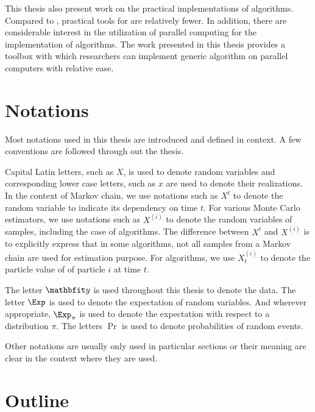 This thesis also present work on the practical implementations of \smc
algorithms. Compared to \mcmc, practical tools for \smc are relatively fewer.
In addition, there are considerable interest in the utilization of parallel
computing for the implementation of \smc algorithms. The work presented in
this thesis provides a toolbox with which researchers can implement generic
\smc algorithm on parallel computers with relative ease.

\section{Notations}
\label{sec:Notations}

Most notations used in this thesis are introduced and defined in context. A
few conventions are followed through out the thesis.

Capital Latin letters, such as $X$, is used to denote random variables and
corresponding lower case letters, such as $x$ are used to denote their
realizations. In the context of Markov chain, we use notations such as $X^t$
to denote the random variable to indicate its dependency on time $t$. For
various Monte Carlo estimators, we use notations such as $X^{(i)}$ to denote
the random variables of samples, including the case of  \mcmc algorithms. The
difference between $X^t$ and $X^{(i)}$ is to explicitly express that in some
algorithms, not all samples from a Markov chain are used for estimation
purpose. For \smc algorithms, we use $X_t^{(i)}$ to denote the particle value
of of particle $i$ at time $t$.

The letter $\data$ is used throughout this thesis to denote the data. The
letter $\Exp$ is used to denote the expectation of random variables. And
wherever appropriate, $\Exp_{\pi}$ is used to denote the expectation with
respect to a distribution $\pi$. The letters $\Pr$ is used to denote
probabilities of random events.

Other notations are usually only used in particular sections or their meaning
are clear in the context where they are used.

\section{Outline}
\label{sec:Outline}

